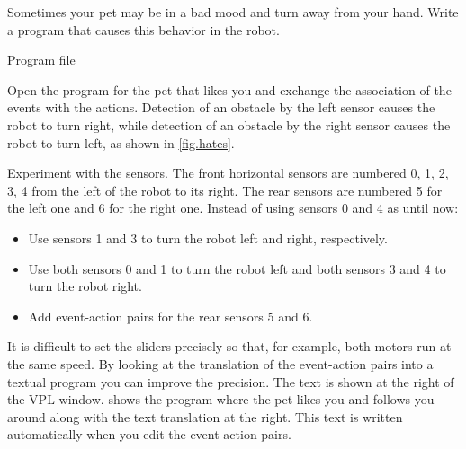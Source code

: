 


Sometimes your pet may be in a bad mood and turn away from your hand.
Write a program that causes this behavior in the robot.

{\raggedleft \hfill Program file }

Open the program for the pet that likes you and exchange the association
of the events with the actions. Detection of an obstacle by the left
sensor causes the robot to turn right, while detection of an obstacle by
the right sensor causes the robot to turn left, as shown in \cref{fig.hates}.


{
Experiment with the sensors.
The front horizontal sensors are numbered 0, 1, 2, 3, 4 from the left of the robot to its right.
The rear sensors are numbered 5 for the left one and 6 for the right one.
Instead of using sensors 0 and 4 as until now:
\begin{itemize}[noitemsep,nosep,leftmargin=*]
\item Use sensors 1 and 3 to turn the robot left and right,
respectively.
\item Use both sensors 0 and 1 to turn the robot left and both sensors 3
and 4 to turn the robot right.
\item Add event-action pairs for the rear sensors 5 and 6.
\end{itemize}
}


It is difficult to set the sliders precisely so that, for example, both
motors run at the same speed. By looking at the translation of the
event-action pairs into a textual program you can improve the precision.
The text is shown at the right of the VPL window.
 shows the program where the pet likes you and follows you around along with the text translation at the right.
This text is written automatically when you edit the event-action pairs.


